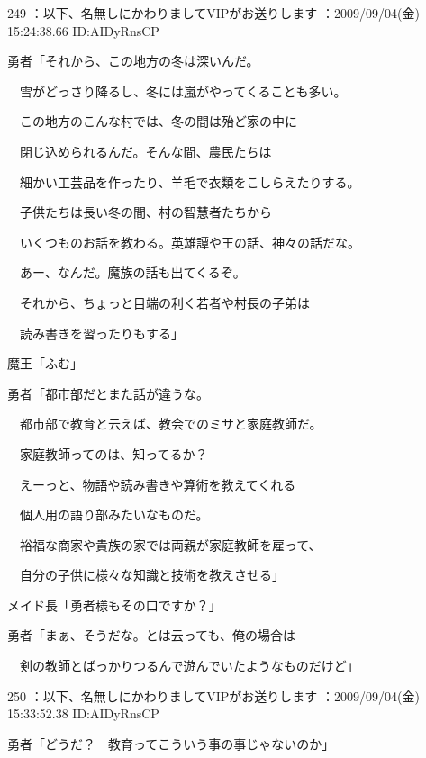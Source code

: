\documentclass[a4j,twocolumn]{tarticle}
\begin{document}
	
    
    

249 ：以下、名無しにかわりましてVIPがお送りします ：2009/09/04(金) 15:24:38.66 ID:AIDyRnsCP 


勇者「それから、この地方の冬は深いんだ。\par{} 
　雪がどっさり降るし、冬には嵐がやってくることも多い。\par{} 
　この地方のこんな村では、冬の間は殆ど家の中に\par{} 
　閉じ込められるんだ。そんな間、農民たちは\par{} 
　細かい工芸品を作ったり、羊毛で衣類をこしらえたりする。\par{} 
　子供たちは長い冬の間、村の智慧者たちから\par{} 
　いくつものお話を教わる。英雄譚や王の話、神々の話だな。\par{} 
　あー、なんだ。魔族の話も出てくるぞ。\par{} 
　それから、ちょっと目端の利く若者や村長の子弟は\par{} 
　読み書きを習ったりもする」 



魔王「ふむ」 



勇者「都市部だとまた話が違うな。\par{} 
　都市部で教育と云えば、教会でのミサと家庭教師だ。\par{} 
　家庭教師ってのは、知ってるか？\par{} 
　えーっと、物語や読み書きや算術を教えてくれる\par{} 
　個人用の語り部みたいなものだ。\par{} 
　裕福な商家や貴族の家では両親が家庭教師を雇って、\par{} 
　自分の子供に様々な知識と技術を教えさせる」 



メイド長「勇者様もその口ですか？」 



勇者「まぁ、そうだな。とは云っても、俺の場合は\par{} 
　剣の教師とばっかりつるんで遊んでいたようなものだけど」 

	
    
    

250 ：以下、名無しにかわりましてVIPがお送りします ：2009/09/04(金) 15:33:52.38 ID:AIDyRnsCP 


勇者「どうだ？　教育ってこういう事の事じゃないのか」 
\end{document}
